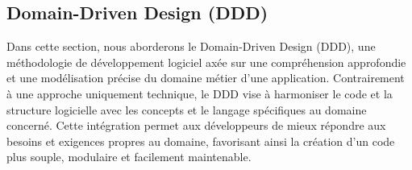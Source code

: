 \subsection{Domain-Driven Design (DDD)}

Dans cette section, nous aborderons le Domain-Driven Design (DDD), une méthodologie de développement logiciel axée sur une compréhension approfondie et une modélisation précise du domaine métier d'une application. Contrairement à une approche uniquement technique, le DDD vise à harmoniser le code et la structure logicielle avec les concepts et le langage spécifiques au domaine concerné. Cette intégration permet aux développeurs de mieux répondre aux besoins et exigences propres au domaine, favorisant ainsi la création d'un code plus souple, modulaire et facilement maintenable.




